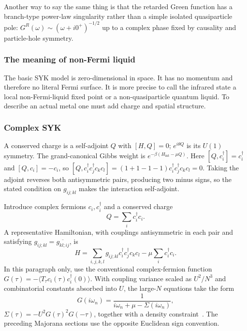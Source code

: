 \documentclass[11pt]{article}
\numberwithin{equation}{section}
\theoremstyle{exposition}
\theoremstyle{result}
\begin{document}
Another way to say the same thing is that the retarded Green function has a branch-type power-law singularity rather than a simple isolated quasiparticle pole: $G^R(\omega)\sim (\omega+i0^+)^{-1/2}$ up to a complex phase fixed by causality and particle-hole symmetry.

\subsubsection{The meaning of non-Fermi liquid}

The basic SYK model is zero-dimensional in space. It has no momentum and therefore no literal Fermi surface. It is more precise to call the infrared state a local non-Fermi-liquid fixed point or a non-quasiparticle quantum liquid. To describe an actual metal one must add charge and spatial structure.

\subsubsection{Complex SYK}


A conserved charge is a self-adjoint $Q$ with $[H,Q]=0$; $e^{i\theta Q}$ is its $U(1)$ symmetry. The grand-canonical Gibbs weight is $e^{-\beta(H_{\mathrm{int}}-\mu Q)}$. Here $[Q,c_i^\dagger]=c_i^\dagger$ and $[Q,c_i]=-c_i$, so $[Q,c_i^\dagger c_j^\dagger c_kc_l]=(1+1-1-1)c_i^\dagger c_j^\dagger c_kc_l=0$. Taking the adjoint reverses both antisymmetric pairs, producing two minus signs, so the stated condition on $g_{ij;kl}$ makes the interaction self-adjoint.

Introduce complex fermions $c_i,c_i^\dagger$ and a conserved charge
\begin{equation*}
Q=\sum_i c_i^\dagger c_i.
\end{equation*}
A representative Hamiltonian, with couplings antisymmetric in each pair and satisfying $g_{ij;kl}=\overline{g_{kl;ij}}$, is
\begin{equation*}
H=\sum_{i,j,k,l}g_{ij;kl}c_i^\dagger c_j^\dagger c_k c_l
-\mu\sum_i c_i^\dagger c_i.
\end{equation*}
In this paragraph only, use the conventional complex-fermion function $G(\tau)=-\langle T_\tau c_i(\tau)c_i^\dagger(0)\rangle$. With coupling variance scaled as $U^2/N^3$ and combinatorial constants absorbed into $U$, the large-$N$ equations take the form
\begin{equation*}
G(i\omega_n)=\frac1{i\omega_n+\mu-\Sigma(i\omega_n)},
\end{equation*}
 $\Sigma(\tau)=-U^2G(\tau)^2G(-\tau)$, together with a density constraint~\cite{NFLReview}. The preceding Majorana sections use the opposite Euclidean sign convention.
\end{document}

